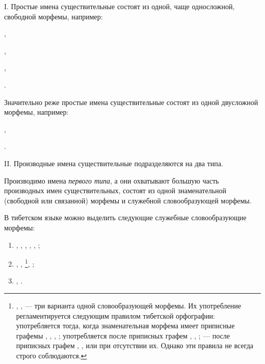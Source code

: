 I. Простые имена существительные состоят из одной, чаще односложной, свободной морфемы, например:
\begin{prfsample}
    \item {},
    \item {},
    \item {},
    \item {}.    
\end{prfsample}
Значительно реже простые имена существительные состоят из одной двусложной морфемы, например:
\begin{prfsample}
    \item {},
    \item {}.   
\end{prfsample}

II. Производные имена существительные подразделяются на два типа.

Производимо имена \emph{первого типа}, а они охватывают большую часть производных имен существительных, состоят из одной знаменательной (свободной или связанной) морфемы и служебной словообразующей морфемы.

В тибетском языке можно выделить следующие служебные словообразующие морфемы:

\begin{enumerate}
    \item {}, , , , , ;
    \item {}, , 
    \footnote[25]{, ,  --- три варианта одной словообразующей морфемы. Их употребление регламентируется следующим правилом тибетской орфографии:  употребляется тогда, когда знаменательная морфема имеет приписные графемы , , , ;  употребляется после приписных графем , , ;  --- после приписных графем , ,  или при отсутствии их. Однако эти правила не всегда строго соблюдаются.},
    ;
    \item {}, .
\end{enumerate}

